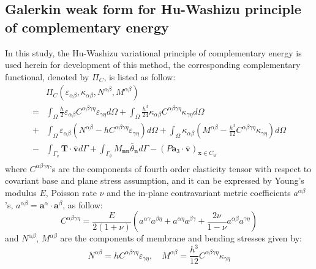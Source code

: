 \subsection{Galerkin weak form for Hu-Washizu principle of complementary energy}
In this study, the Hu-Washizu variational principle of complementary energy \cite{dah-wei1985} is used herein for development of this method, the corresponding complementary functional, denoted by $\Pi_C$, is listed as follow:
\begin{equation} \label{functionalc}
\begin{split}
&\Pi_C(\varepsilon_{\alpha\beta},\kappa_{\alpha\beta},N^{\alpha\beta},M^{\alpha\beta}) \\
= &\int_\Omega \frac{h}{2}\varepsilon_{\alpha\beta} C^{\alpha\beta\gamma\eta}\varepsilon_{\gamma\eta}d\Omega 
+ \int_\Omega \frac{h^3}{24}\kappa_{\alpha\beta} C^{\alpha\beta\gamma\eta}\kappa_{\gamma\eta}d\Omega \\
+& \int_\Omega \varepsilon_{\alpha\beta} (N^{\alpha\beta} - h C^{\alpha\beta\gamma\eta} \varepsilon_{\gamma\eta}) d\Omega
+ \int_\Omega \kappa_{\alpha\beta} (M^{\alpha\beta} - \frac{h^3}{12} C^{\alpha\beta\gamma\eta} \kappa_{\gamma\eta}) d\Omega \\
-& \int_{\Gamma_v} \boldsymbol T \cdot \bar{\boldsymbol v} d\Gamma 
+ \int_{\Gamma_\theta} M_{\boldsymbol{nn}} \bar \theta_{\boldsymbol n} d\Gamma - (P \boldsymbol a_3 \cdot \bar{\boldsymbol v})_{\boldsymbol x \in C_w} \\
\end{split}
\end{equation}
where $C^{\alpha\beta\gamma\eta}$'s are the components of fourth order elasticity tensor with respect to covariant base and plane stress assumption, and it can be expressed by Young's modulus $E$, Poisson rate $\nu$ and the in-plane contravariant metric coefficients $a^{\alpha\beta}$'s, $a^{\alpha\beta} = \boldsymbol a^\alpha \cdot \boldsymbol a^\beta$, as follow: 
\begin{equation}
C^{\alpha\beta\gamma\eta} = \frac{E}{2(1+\nu)}(a^{\alpha\gamma}a^{\beta\eta} + a^{\alpha\eta}a^{\beta\gamma} + \frac{2\nu}{1-\nu} a^{\alpha\beta}a^{\gamma\eta})
\end{equation}
and $N^{\alpha\beta}$, $M^{\alpha\beta}$ are the components of membrane and bending stresses given by:
\begin{equation}
N^{\alpha\beta} = hC^{\alpha\beta\gamma\eta}\varepsilon_{\gamma\eta}, \quad
M^{\alpha\beta} = \frac{h^3}{12}C^{\alpha\beta\gamma\eta}\kappa_{\gamma\eta}
\end{equation}

